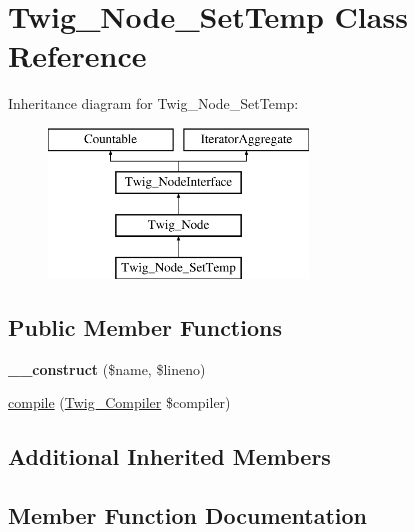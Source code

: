 \hypertarget{class_twig___node___set_temp}{}\section{Twig\+\_\+\+Node\+\_\+\+Set\+Temp Class Reference}
\label{class_twig___node___set_temp}
Inheritance diagram for Twig\+\_\+\+Node\+\_\+\+Set\+Temp\+:\begin{figure}[H]
\begin{center}
\leavevmode
\includegraphics[height=4.000000cm]{class_twig___node___set_temp}
\end{center}
\end{figure}
\subsection*{Public Member Functions}
\begin{DoxyCompactItemize}
\item 
\hypertarget{class_twig___node___set_temp_ae217ce26c809152fd385490096a36b75}{}{\bfseries \+\_\+\+\_\+construct} (\$name, \$lineno)\label{class_twig___node___set_temp_ae217ce26c809152fd385490096a36b75}

\item 
\hyperlink{class_twig___node___set_temp_a4e0faa87c3fae583620b84d3607085da}{compile} (\hyperlink{class_twig___compiler}{Twig\+\_\+\+Compiler} \$compiler)
\end{DoxyCompactItemize}
\subsection*{Additional Inherited Members}


\subsection{Member Function Documentation}
\hypertarget{class_twig___node___set_temp_a4e0faa87c3fae583620b84d3607085da}{}

